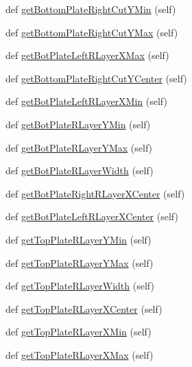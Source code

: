 \begin{DoxyCompactItemize}
\item 
def \mbox{\hyperlink{classpython_1_1capacitorunit_1_1CapacitorUnit_a27c6ba5c13e8838ffdba1d7005d52cdc}{get\+Bottom\+Plate\+Right\+Cut\+Y\+Min}} (self)
\item 
def \mbox{\hyperlink{classpython_1_1capacitorunit_1_1CapacitorUnit_ac90114c3fc7731a8de7a65136371759b}{get\+Bottom\+Plate\+Right\+Cut\+Y\+Max}} (self)
\item 
def \mbox{\hyperlink{classpython_1_1capacitorunit_1_1CapacitorUnit_a8f1e061c67e1794bf35624c57e75c5b7}{get\+Bot\+Plate\+Left\+R\+Layer\+X\+Max}} (self)
\item 
def \mbox{\hyperlink{classpython_1_1capacitorunit_1_1CapacitorUnit_aed67ac964dc5d63b17a36e6a13a09b03}{get\+Bottom\+Plate\+Right\+Cut\+Y\+Center}} (self)
\item 
def \mbox{\hyperlink{classpython_1_1capacitorunit_1_1CapacitorUnit_a85436b731b94a4addbddd2868d842976}{get\+Bot\+Plate\+Left\+R\+Layer\+X\+Min}} (self)
\item 
def \mbox{\hyperlink{classpython_1_1capacitorunit_1_1CapacitorUnit_a1599c5468bec2b820a9d37362d21b223}{get\+Bot\+Plate\+R\+Layer\+Y\+Min}} (self)
\item 
def \mbox{\hyperlink{classpython_1_1capacitorunit_1_1CapacitorUnit_a61d33d28fd5e266cc84eeefabe3460a9}{get\+Bot\+Plate\+R\+Layer\+Y\+Max}} (self)
\item 
def \mbox{\hyperlink{classpython_1_1capacitorunit_1_1CapacitorUnit_a57d6ff2f5cf8cd47476eba0c7dd8b183}{get\+Bot\+Plate\+R\+Layer\+Width}} (self)
\item 
def \mbox{\hyperlink{classpython_1_1capacitorunit_1_1CapacitorUnit_adc34c9971aa055acb6ff7dde24d5ffac}{get\+Bot\+Plate\+Right\+R\+Layer\+X\+Center}} (self)
\item 
def \mbox{\hyperlink{classpython_1_1capacitorunit_1_1CapacitorUnit_a69ed3dbeb675f6c2c52586f4fb3e2e11}{get\+Bot\+Plate\+Left\+R\+Layer\+X\+Center}} (self)
\item 
def \mbox{\hyperlink{classpython_1_1capacitorunit_1_1CapacitorUnit_a3765ea9bb990f6f6e22aa8292158587e}{get\+Top\+Plate\+R\+Layer\+Y\+Min}} (self)
\item 
def \mbox{\hyperlink{classpython_1_1capacitorunit_1_1CapacitorUnit_aed0bf7a26c5ee2d1baf06b55084826f2}{get\+Top\+Plate\+R\+Layer\+Y\+Max}} (self)
\item 
def \mbox{\hyperlink{classpython_1_1capacitorunit_1_1CapacitorUnit_a4b2683706e1bf6b90ada029ffc38950e}{get\+Top\+Plate\+R\+Layer\+Width}} (self)
\item 
def \mbox{\hyperlink{classpython_1_1capacitorunit_1_1CapacitorUnit_a92c7940656b8f2940f4a39f167880ff4}{get\+Top\+Plate\+R\+Layer\+X\+Center}} (self)
\item 
def \mbox{\hyperlink{classpython_1_1capacitorunit_1_1CapacitorUnit_a9a2ffcdaaabfec8adb1c8a67f82eec67}{get\+Top\+Plate\+R\+Layer\+X\+Min}} (self)
\item 
def \mbox{\hyperlink{classpython_1_1capacitorunit_1_1CapacitorUnit_a279a946fe3127e06435d8eadfa62ec04}{get\+Top\+Plate\+R\+Layer\+X\+Max}} (self)
\end{DoxyCompactItemize}


